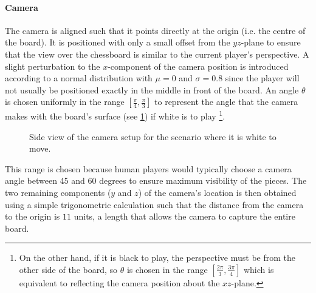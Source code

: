 \documentclass[../main.tex]{subfiles}
\begin{document}
\paragraph{Camera}
The camera is aligned such that it points directly at the origin (i.e. the centre of the board).
It is positioned with only a small offset from the $yz$-plane to ensure that the view over the chessboard is similar to the current player's perspective. 
A slight perturbation to the $x$-component of the camera position is introduced according to a normal distribution with $\mu=0$ and $\sigma=0.8$ since the player will not usually be positioned exactly in the middle in front of the board.
An angle $\theta$ is chosen uniformly in the range $\left[\frac{\pi}{4},\frac{\pi}{3}\right]$ to represent the angle that the camera makes with the board's surface (see \cref{fig:camera_angle}) if white is to play%
\footnote{On the other hand, if it is black to play, the perspective must be from the other side of the board, so $\theta$ is chosen in the range $\left[\frac{2\pi}{3},\frac{3\pi}{4}\right]$ which is equivalent to reflecting the camera position about the $xz$-plane.}.
\begin{figure}
    \centering
    \caption{Side view of the camera setup for the scenario where it is white to move. }
    \label{fig:camera_angle}
\end{figure}
This range is chosen because human players would typically choose a camera angle between 45 and 60 degrees to ensure maximum visibility of the pieces.
The two remaining components ($y$ and $z$) of the camera's location is then obtained using a simple trigonometric calculation such that the distance from the camera to the origin is $11$ units, a length that allows the camera to capture the entire board.
\end{document}

